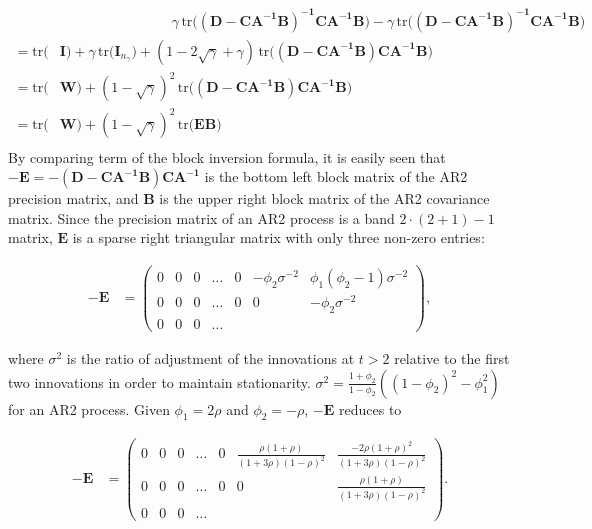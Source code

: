 \documentclass[12pt,a4paper]{article}
\begin{document}
\begin{align*}
&\qquad \qquad \qquad \qquad \gamma \, \text{tr} \big(\boldsymbol{(D-CA^{-1}B)^{-1}CA^{-1}B} \big) - \gamma \, \text{tr} \big(\boldsymbol{(D-CA^{-1}B)^{-1}CA^{-1}B} \big) \\
= \text{tr} \big(& \boldsymbol{I} \big) +  \gamma \, \text{tr} \big( \boldsymbol{I}_{n_{\gamma}} \big) + (1-2\sqrt{\gamma} + \gamma) \, \text{tr} \big( \boldsymbol{(D-CA^{-1}B)CA^{-1}B} \big)\\
= \text{tr} \big(& \boldsymbol{W} \big) +  (1 - \sqrt{\gamma})^2 \, \text{tr} \big( \boldsymbol{(D-CA^{-1}B)CA^{-1}B} \big)\\
= \text{tr} \big(& \boldsymbol{W} \big) +  (1 - \sqrt{\gamma})^2 \, \text{tr} \big( \boldsymbol{EB} \big)\\
\end{align*}
By comparing term of the block inversion formula, it is easily seen that $-\boldsymbol{E} = -\boldsymbol{(D-CA^{-1}B)CA^{-1}}$ is the bottom left block matrix of the AR2 precision matrix, and $\boldsymbol{B}$ is the upper right block matrix of the AR2 covariance matrix. Since the precision matrix of an AR2 process is a band $2 \cdot (2+1) - 1$ matrix, $\boldsymbol{E}$ is a sparse right triangular matrix with only three non-zero entries:

\begin{align*}
-\boldsymbol{E} &= \begin{pmatrix}
0 & 0 & 0 & \dots & 0 & -\phi_2 \sigma^{-2} & \phi_1 (\phi_2 - 1) \sigma^{-2} \\
0 & 0 & 0 & \dots & 0 & 0 & -\phi_2 \sigma^{-2} \\
0 & 0 & 0 & \dots 
\end{pmatrix},
\end{align*}

where $\sigma^{2}$ is the ratio of adjustment of the innovations at $t>2$ relative to the first two innovations in order to maintain stationarity. $\sigma^2 = \frac{1+\phi_2}{1-\phi_2}((1-\phi_2)^2 - \phi_1^2)$ for an AR2 process. Given $\phi_1 = 2\rho$ and $\phi_2 = -\rho$, $-\boldsymbol{E}$ reduces to

\begin{align*}
-\boldsymbol{E} &= \begin{pmatrix}
0 & 0 & 0 & \dots & 0 & \frac{\rho (1+\rho)}{(1+3\rho)(1-\rho)^{2}} & \frac{-2\rho (1+\rho)^2}{(1+3\rho)(1-\rho)^{2}}\\
0 & 0 & 0 & \dots & 0 & 0 &  \frac{\rho (1+\rho)}{(1+3\rho)(1-\rho)^{2}}  \\
0 & 0 & 0 & \dots 
\end{pmatrix}. 
\end{align*}
\end{document}
